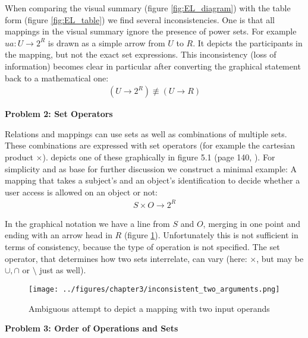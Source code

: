 \documentclass[twoside, openright, 12pt]{book}
\begin{document}
\noindent
When comparing the visual summary (figure \ref{fig:EL_diagram}) with the table form (figure \ref{fig:EL_table}) we find several inconsistencies.
One is that all mappings in the visual summary ignore the presence of power sets.
For example $ua: U \rightarrow 2^R$ is drawn as a simple arrow from $U$ to $R$.
It depicts the participants in the mapping, but not the exact set expressions.
This inconsistency (loss of information) becomes clear in particular after converting the graphical statement back to a mathematical one:
\begin{align}
(U \rightarrow 2^R) \not\equiv (U \rightarrow R)
\end{align}



\vspace{4mm}
\noindent
\textbf{Problem 2: Set Operators}
\vspace{1mm}

\noindent
Relations and mappings can use sets as well as combinations of multiple sets.
These combinations are expressed with set operators (for example the cartesian product $\times$).
\cite{Amthor18} depicts one of these graphically in figure 5.1 (page 140, \citep{Amthor18}).
For simplicity and as base for further discussion we construct a minimal example: A mapping that takes a subject's and an object's identification to decide whether a user access is allowed on an object or not:
\begin{align}
S \times O \rightarrow 2^R
\end{align}

\noindent
In the graphical notation we have a line from $S$ and $O$, merging in one point and ending with an arrow head in $R$ (figure \ref{fig:inconsistent_two_arguments}).
Unfortunately this is not sufficient in terms of consistency, because the type of operation is not specified.
The set operator, that determines how two sets interrelate, can vary (here: $\times$, but may be $\cup, \cap$ or $\setminus$ just as well).

\begin{figure}[htb]
	\centering
	\texttt{[image: ../figures/chapter3/inconsistent\_two\_arguments.png]}
	\caption{Ambiguous attempt to depict a mapping with two input operands}
	\label{fig:inconsistent_two_arguments}
\end{figure}



\vspace{4mm}
\noindent
\textbf{Problem 3: Order of Operations and Sets}
\vspace{1mm}
\end{document}
